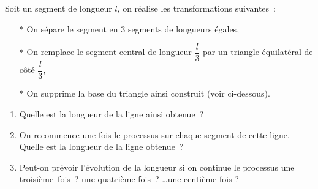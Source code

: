 \exercice Soit un segment de longueur $l$, on réalise les transformations suivantes~:
\begin{enumerate}
	\item[$*$] On sépare le segment en 3 segments de longueurs égales,
	\item[$*$] On remplace le segment central de longueur $\dfrac{l}{3}$ par un triangle équilatéral de côté $\dfrac{l}{3}$,
	\item[$*$] On supprime la base du triangle ainsi construit (voir ci-dessous).
\end{enumerate}
			
\vspace*{2em}


\begin{center}
\end{center}

\begin{enumerate}
	\item Quelle est la longueur de la ligne ainsi obtenue~?
	\item On recommence une fois le processus sur chaque segment de cette ligne.\\ Quelle est la longueur de la ligne obtenue~?
	\item Peut-on prévoir l'évolution de la longueur si on continue le processus une troisième~fois~? une quatrième fois~? \ldots une centième fois ?
\end{enumerate}

\vspace*{2em}

\hfill \BONNESVACANCES